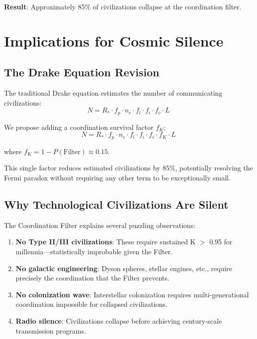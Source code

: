 \documentclass[11pt,a4paper]{article}
\begin{document}
\textbf{Result}: Approximately 85\% of civilizations collapse at the coordination filter.

\section{Implications for Cosmic Silence}

\subsection{The Drake Equation Revision}

The traditional Drake equation estimates the number of communicating civilizations:
\begin{equation}
N = R_* \cdot f_p \cdot n_e \cdot f_l \cdot f_i \cdot f_c \cdot L
\end{equation}

We propose adding a coordination survival factor $f_K$:
\begin{equation}
N = R_* \cdot f_p \cdot n_e \cdot f_l \cdot f_i \cdot f_c \cdot f_K \cdot L
\end{equation}

where $f_K = 1 - P(\text{Filter}) \approx 0.15$.

This single factor reduces estimated civilizations by 85\%, potentially resolving the Fermi paradox without requiring any other term to be exceptionally small.

\subsection{Why Technological Civilizations Are Silent}

The Coordination Filter explains several puzzling observations:

\begin{enumerate}
    \item \textbf{No Type II/III civilizations}: These require sustained K $>$ 0.95 for millennia---statistically improbable given the Filter.

    \item \textbf{No galactic engineering}: Dyson spheres, stellar engines, etc., require precisely the coordination that the Filter prevents.

    \item \textbf{No colonization wave}: Interstellar colonization requires multi-generational coordination impossible for collapsed civilizations.

    \item \textbf{Radio silence}: Civilizations collapse before achieving century-scale transmission programs.
\end{enumerate}
\end{document}
